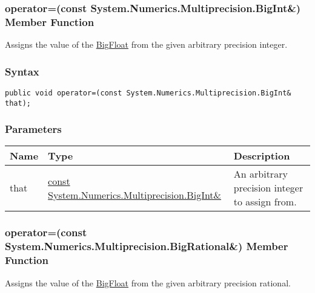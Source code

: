 \documentclass[a4paper,oneside,11.000000pt]{book}
\begin{document}
\hypertarget{System.Numerics.Multiprecision.BigFloat.operator.assign.P.System.Numerics.Multiprecision.BigFloat.C.R.System.Numerics.Multiprecision.BigInt}{\subsubsection*{operator=(const System.Numerics.Multiprecision.BigInt\&) Member Function}}
\begin{flushleft}
Assigns the value of the \hyperlink{System.Numerics.Multiprecision.BigFloat}{BigFloat} from the given arbitrary precision integer.

\end{flushleft}
\subsubsection*{Syntax}
\texttt{public void operator=(const System.Numerics.Multiprecision.BigInt\& that);}
\subsubsection*{Parameters}
\begin{flushleft}
\begin{supertabular}[l]{!{\raggedright}p{1.30721cm}!{\raggedright}p{8.55945cm}!{\raggedright}p{4.93333cm}}
\textbf{Name}
& \textbf{Type}
& \textbf{Description}
\\
\hline
that
& \hyperlink{System.Numerics.Multiprecision.BigInt}{const System.\-Numerics.\-Multiprecision.\-BigInt\&\-}
& An arbitrary precision integer to assign from.

\\
\end{supertabular}

\end{flushleft}
\clearpage

\hypertarget{System.Numerics.Multiprecision.BigFloat.operator.assign.P.System.Numerics.Multiprecision.BigFloat.C.R.System.Numerics.Multiprecision.BigRational}{\subsubsection*{operator=(const System.Numerics.Multiprecision.BigRational\&) Member Function}}
\begin{flushleft}
Assigns the value of the \hyperlink{System.Numerics.Multiprecision.BigFloat}{BigFloat} from the given arbitrary precision rational.

\end{flushleft}
\end{document}
